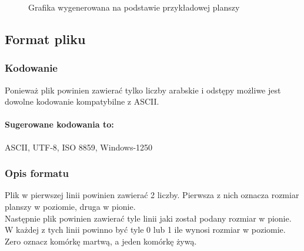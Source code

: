 \documentclass{report}
\begin{document}
\begin{figure}[h]
\centering
\setlength{\fboxsep}{0pt} %
\setlength{\fboxrule}{1pt} %
\caption{Grafika wygenerowana na podstawie przykładowej planszy}
\end{figure}

\subsection{Format pliku}
\subsubsection*{Kodowanie}
Ponieważ plik powinien zawierać tylko liczby arabskie i odstępy możliwe jest dowolne kodowanie kompatybilne z ASCII. \\
\paragraph{Sugerowane kodowania to:}
ASCII, UTF-8, ISO 8859, Windows-1250

\subsubsection*{Opis formatu}
Plik w pierwszej linii powinien zawierać 2 liczby. Pierwsza z nich oznacza rozmiar planszy w poziomie, druga w pionie. \\
Następnie plik powinien zawierać tyle linii jaki został podany rozmiar w pionie. W każdej z tych linii powinno być tyle 0 lub 1 ile wynosi rozmiar w poziomie. \\
Zero oznacz komórkę martwą, a jeden komórkę żywą.
\end{document}
